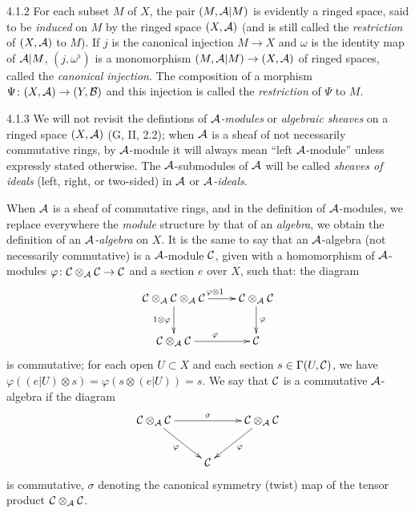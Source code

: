 \begin{env}{4.1.2}
\label{env-0.4.1.2}
For each subset $M$ of $X$, the pair $(M,\mathcal{A}|M)$ is evidently a ringed space, said
to be \emph{induced} on $M$ by the ringed space $(X,\mathcal{A})$ (and is still called
the \emph{restriction} of $(X,\mathcal{A})$ to $M$). If $j$ is the canonical injection
$M\to X$ and $\omega$ is the identity map of $\mathcal{A}|M$, $(j,\omega^\flat)$ is a
monomorphism $(M,\mathcal{A}|M)\to(X,\mathcal{A})$ of ringed spaces, called the
\emph{canonical injection}. The composition of a morphism
$\Psi\colon(X,\mathcal{A})\to(Y,\mathcal{B})$ and this injection is called the \emph{restriction}
of $\Psi$ to $M$.
\end{env}

\begin{env}{4.1.3}
\label{env-0.4.1.3}
We will not revisit the defintions of \emph{$\mathcal{A}$-modules} or
\emph{algebraic sheaves} on a ringed space $(X,\mathcal{A})$ (G, II, 2.2);
when $\mathcal{A}$ is a sheaf of not necessarily commutative rings, by $\mathcal{A}$-module
it will always mean ``left $\mathcal{A}$-module'' unless expressly stated otherwise. The
$\mathcal{A}$-submodules of $\mathcal{A}$ will be called \emph{sheaves of ideals} (left,
right, or two-sided) in $\mathcal{A}$ or \emph{$\mathcal{A}$-ideals}.

When $\mathcal{A}$ is a sheaf of commutative rings, and in the definition of
$\mathcal{A}$-modules, we replace everywhere the \emph{module} structure by that of
an \emph{algebra}, we obtain the definition of an \emph{$\mathcal{A}$-algebra} on $X$.
It is the same to say that an $\mathcal{A}$-algebra (not necessarily commutative) is
a $\mathcal{A}$-module $\mathcal{C}$, given with a homomorphism of $\mathcal{A}$-modules
$\varphi\colon\mathcal{C}\otimes_{\mathcal{A}}\mathcal{C}\to\mathcal{C}$ and a section $e$ over $X$,
such that:  the diagram
\[
  \xymatrix{
    \sheaf{C}\otimes_{\sheaf{A}}\sheaf{C}\otimes_{\sheaf{A}}\sheaf{C}
    \ar[r]^{\varphi\otimes 1}\ar[d]_{1\otimes\varphi} &
    \sheaf{C}\otimes_{\sheaf{A}}\sheaf{C}\ar[d]^\varphi\\
    \sheaf{C}\otimes_{\sheaf{A}}\sheaf{C}\ar[r]^\varphi & \sheaf{C}
  }
\]
is commutative;  for each open $U\subset X$ and each section $s\in\Gamma(U,\mathcal{C})$,
we have $\varphi((e|U)\otimes s)=\varphi(s\otimes(e|U))=s$. We say that $\mathcal{C}$ is a
commutative $\mathcal{A}$-algebra if the diagram
\[
  \xymatrix{
    \sheaf{C}\otimes_{\sheaf{A}}\sheaf{C}\ar[rr]^\sigma\ar[rd]_\varphi
    & & \sheaf{C}\otimes_{\sheaf{A}}\sheaf{C}\ar[ld]^\varphi\\
    & \sheaf{C}
  }
\]
is commutative, $\sigma$ denoting the canonical symmetry (twist) map of the tensor product
$\mathcal{C}\otimes_{\mathcal{A}}\mathcal{C}$.


\end{env}
